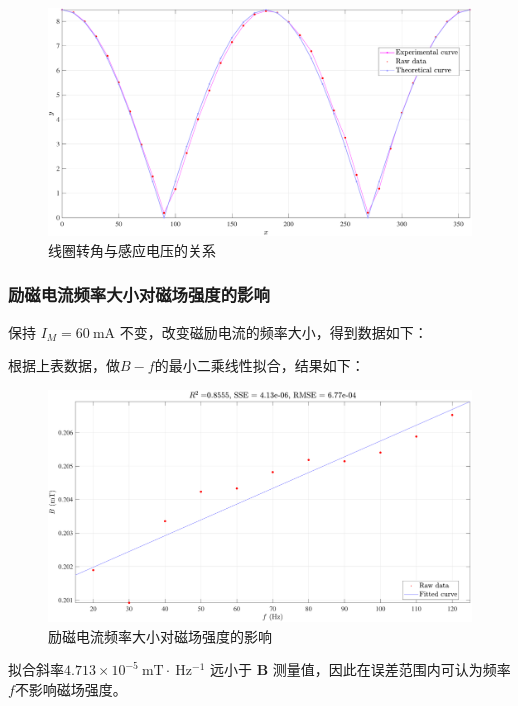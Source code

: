 \documentclass[UTF8]{article}
\theoremstyle{MyLineTheoremStyle} %
\theoremstyle{MyBlockTheoremStyle} %
\theoremstyle{MySubsubsectionStyle} %
\begin{document}
\begin{figure}[H]\centering
    \includegraphics[width=0.9\columnwidth]{assets/2/9.pdf}
    \caption{线圈转角与感应电压的关系}
    \label{线圈转角与感应电压的关系}
\end{figure}

\subsubsection{励磁电流频率大小对磁场强度的影响}
保持 $I_M = 60 \ \mathrm{mA}$ 不变，改变磁励电流的频率大小，得到数据如下：
\begin{table}[H]\centering
    \caption{励磁电流频率大小对磁场强度的影响}
    \label{励磁电流频率大小对磁场强度的影响}
\end{table}
根据上表数据，做$ B-f $的最小二乘线性拟合，结果如下：
\begin{figure}[H]\centering
    \includegraphics[width=0.9\columnwidth]{assets/2/10.pdf}
    \caption{励磁电流频率大小对磁场强度的影响}
\end{figure}
拟合斜率$ 4.713\times10^{-5} \ \mathrm{mT}\cdot \ \mathrm{Hz^{-1}}$ 远小于 $\boldsymbol{B}$ 测量值，因此在误差范围内可认为频率$ f $不影响磁场强度。
\end{document}

